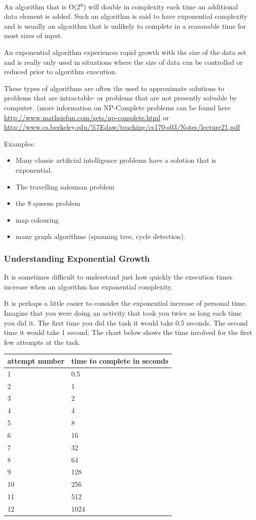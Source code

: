 An algorithm that is O(2\textsuperscript{n}) will double in
complexity each time an additional data element is added. Such an
algorithm is said to have exponential complexity and is usually an
algorithm that is unlikely to complete in a reasonable time for most
sizes of input.

An exponential algorithm experiences rapid growth with
the size of the data set and is really only used in situations where the
size of data can be controlled or reduced prior to algorithm execution.

These types of algorithms are often the used to approximate solutions to
problems that are intractable- or problems that are not presently
solvable by computer. (more information on NP-Complete problems can be
found here \url{http://www.mathsisfun.com/sets/np-complete.html} or
\url{http://www.cs.berkeley.edu/\%7Edaw/teaching/cs170-s03/Notes/lecture21.pdf}

Examples:
\begin{itemize}

\item Many classic artificial intelligence problems have a solution that is
  exponential.
\item  The travelling salesman problem
\item the 8 queens problem
\item map colouring
\item  many graph algorithms (spanning tree, cycle detection).
\end{itemize}

\subsubsection {Understanding Exponential Growth}
 It is sometimes difficult to understand just how quickly the execution times increase when an algorithm has exponential complexity.  
 
 It is perhaps a little easier to consider the exponential increase of personal time.  Imagine that you were doing an activity that took you twice as long each time you did it.    The first time you did the task it would take  0.5 seconds.  The second time it would take 1 second.   The chart below shows the time involved for the first few attempts at the task.
 
\begin{tabular}{l|l}
attempt number & time to complete  in seconds\\ \hline
1 & 0.5 \\
2 & 1 \\
3 & 2 \\
4 & 4 \\
5 & 8 \\
6 & 16 \\
7 & 32 \\
8 & 64 \\
9 & 128 \\
10 & 256 \\
11 & 512 \\
12 & 1024\\ \hline
\end{tabular}

